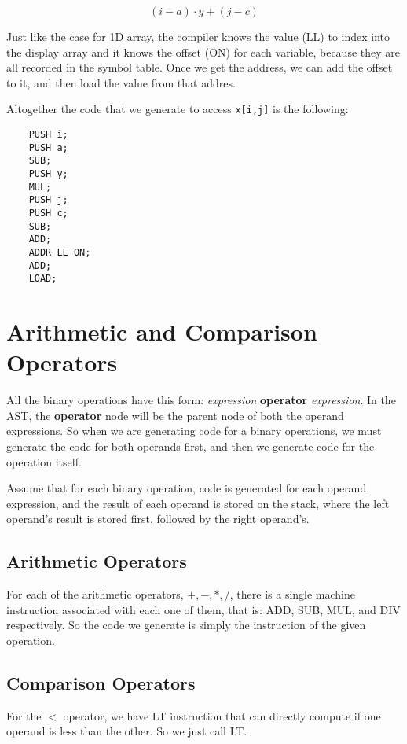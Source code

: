 \documentclass{article}
\begin{document}
$$(i - a) \cdot y + (j - c)$$

Just like the case for 1D array, the compiler knows the value (LL) to index into the display array and it knows the offset (ON) for each variable, because they are all recorded in the symbol table. Once we get the address, we can add the offset to it, and then load the value from that addres.

Altogether the code that we generate to access \texttt{x[i,j]} is the following:

\begin{lstlisting}
    PUSH i;
    PUSH a;
    SUB;
    PUSH y;
    MUL;
    PUSH j;
    PUSH c;
    SUB;
    ADD;
    ADDR LL ON;
    ADD;
    LOAD;
\end{lstlisting}


\section{Arithmetic and Comparison Operators}

All the binary operations have this form: \textit{expression} \textbf{operator} \textit{expression}. In the AST, the \textbf{operator} node will be the parent node of both the operand expressions. So when we are generating code for a binary operations, we must generate the code for both operands first, and then we generate code for the operation itself.

Assume that for each binary operation, code is generated for each operand expression, and the result of each operand is stored on the stack, where the left operand's result is stored first, followed by the right operand's.

\subsection{Arithmetic Operators}

For each of the arithmetic operators, $+,-,*,/$, there is a single machine instruction associated with each one of them, that is: ADD, SUB, MUL, and DIV respectively. So the code we generate is simply the instruction of the given operation.

\subsection{Comparison Operators}

For the $<$ operator, we have LT instruction that can directly compute if one operand is less than the other. So we just call LT.
\end{document}
